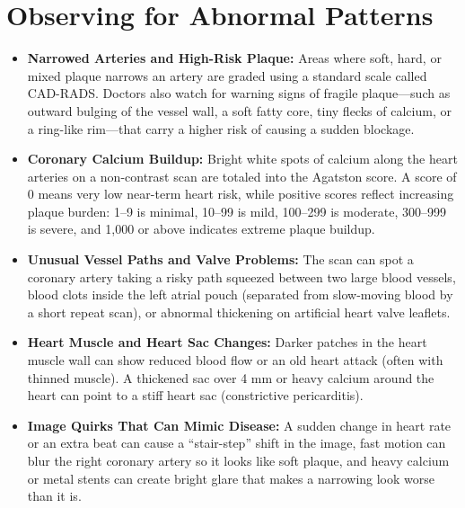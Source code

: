 \section{Observing for Abnormal Patterns}
\begin{itemize}
    \item \textbf{Narrowed Arteries and High-Risk Plaque:} Areas where soft, hard, or mixed plaque narrows an artery are graded using a standard scale called CAD-RADS. Doctors also watch for warning signs of fragile plaque---such as outward bulging of the vessel wall, a soft fatty core, tiny flecks of calcium, or a ring-like rim---that carry a higher risk of causing a sudden blockage.
    \item \textbf{Coronary Calcium Buildup:} Bright white spots of calcium along the heart arteries on a non-contrast scan are totaled into the Agatston score. A score of 0 means very low near-term heart risk, while positive scores reflect increasing plaque burden: 1--9 is minimal, 10--99 is mild, 100--299 is moderate, 300--999 is severe, and 1,000 or above indicates extreme plaque buildup.
    \item \textbf{Unusual Vessel Paths and Valve Problems:} The scan can spot a coronary artery taking a risky path squeezed between two large blood vessels, blood clots inside the left atrial pouch (separated from slow-moving blood by a short repeat scan), or abnormal thickening on artificial heart valve leaflets.
    \item \textbf{Heart Muscle and Heart Sac Changes:} Darker patches in the heart muscle wall can show reduced blood flow or an old heart attack (often with thinned muscle). A thickened sac over 4 mm or heavy calcium around the heart can point to a stiff heart sac (constrictive pericarditis).
    \item \textbf{Image Quirks That Can Mimic Disease:} A sudden change in heart rate or an extra beat can cause a ``stair-step'' shift in the image, fast motion can blur the right coronary artery so it looks like soft plaque, and heavy calcium or metal stents can create bright glare that makes a narrowing look worse than it is.
\end{itemize}

